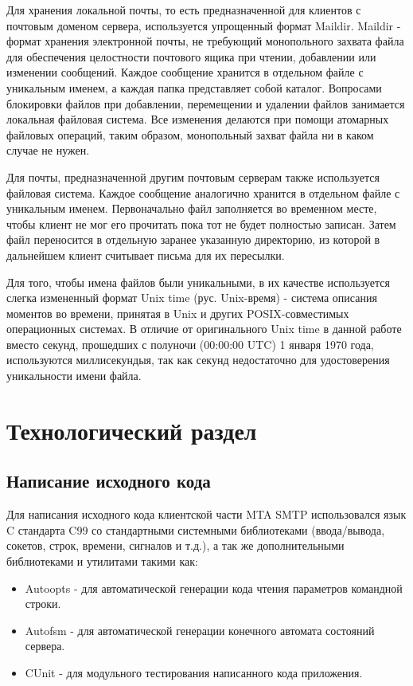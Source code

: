 \documentclass[a4paper,12pt]{report}
\begin{document}
Для хранения локальной почты, то есть предназначенной для клиентов с почтовым доменом сервера, используется упрощенный формат Maildir. Maildir - формат хранения электронной почты, не требующий монопольного захвата файла для обеспечения целостности почтового ящика при чтении, добавлении или изменении сообщений. Каждое сообщение хранится в отдельном файле с уникальным именем, а каждая папка представляет собой каталог. Вопросами блокировки файлов при добавлении, перемещении и удалении файлов занимается локальная файловая система. Все изменения делаются при помощи атомарных файловых операций, таким образом, монопольный захват файла ни в каком случае не нужен.

Для почты, предназначенной другим почтовым серверам также используется файловая система. Каждое сообщение аналогично хранится в отдельном файле с уникальным именем. Первоначально файл заполняется во временном месте, чтобы клиент не мог его прочитать пока тот не будет полностью записан. Затем файл переносится в отдельную заранее указанную директорию, из которой в дальнейшем клиент считывает письма для их пересылки. 

Для того, чтобы имена файлов были уникальными, в их качестве используется слегка измененный формат Unix time (рус. Unix-время) - система описания моментов во времени, принятая в Unix и других POSIX-совместимых операционных системах. В отличие от оригинального Unix time в данной работе вместо секунд, прошедших с полуночи (00:00:00 UTC) 1 января 1970 года, используются миллисекундыя, так как секунд недостаточно для удостоверения уникальности имени файла.


\chapter{Технологический раздел}


\section{Написание исходного кода}

Для написания исходного кода клиентской части MTA SMTP использовался язык C стандарта C99 со стандартными системными библиотеками (ввода/вывода, сокетов, строк, времени, сигналов и т.д.), а так же дополнительными библиотеками и утилитами такими как:
\begin{itemize}
    \item Autoopts - для автоматической генерации кода чтения параметров командной строки.
    \item Autofsm - для автоматической генерации конечного автомата состояний сервера.
    \item CUnit - для модульного тестирования написанного кода приложения.
\end{itemize}
\end{document}
